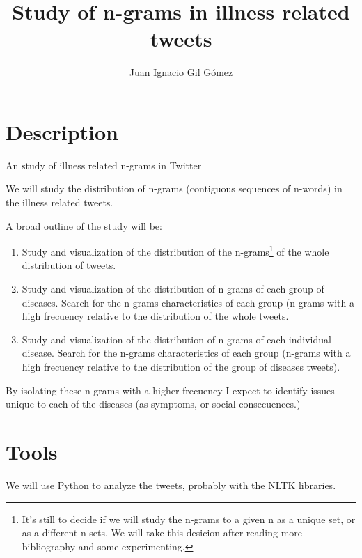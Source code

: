 \documentclass[11pt]{article} %
\title{Study of n-grams in illness related tweets}
\author{Juan Ignacio Gil G\'{o}mez}
\begin{document}
\maketitle

\section{Description}

An study of illness related n-grams in Twitter

We will study the distribution of n-grams (contiguous sequences of n-words) in the illness related tweets.

A broad outline of the study will be:
\begin{enumerate}
\item Study and visualization of the distribution of the n-grams\footnote{It's still to decide if we will study the n-grams to a given n as a unique set, or as a different n sets. We will take this desicion after reading more bibliography and some experimenting.} of the whole distribution of tweets.

\item Study and visualization of the distribution of n-grams of each group of diseases. Search for the n-grams characteristics of each group (n-grams with a high frecuency relative to the distribution of the whole tweets.

\item Study and visualization of the distribution of n-grams of each individual disease. Search for the n-grams characteristics of each group (n-grams with a high frecuency relative to the distribution of the group of diseases tweets).

\end{enumerate}

By isolating these n-grams with a higher frecuency I expect to identify issues unique to each of the diseases (as symptoms, or social consecuences.)

\section{Tools}

We will use Python to analyze the tweets, probably with the NLTK libraries.
\end{document}
